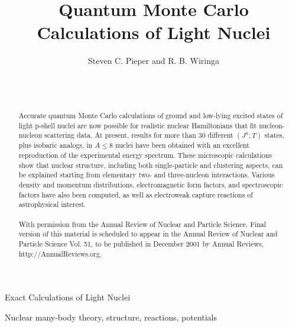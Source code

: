 
\renewcommand{\topfraction}{1.00}
\renewcommand{\bottomfraction}{1.00}
\renewcommand{\textfraction}{0.00}


\renewcommand{\baselinestretch}{1.0}
\renewcommand{\evensidemargin}{0pc}
\renewcommand{\oddsidemargin}{0pc}
\setlength{\textwidth}{5.42in}
\setlength{\textheight}{7.825in}




\def\ms{\hspace{1.5mm}}
\def\Athpi{A_{3\pi}^{\Delta R}}
\def\tvij{\tilde{v}_{ij}}
\def\tv{\tilde{v}}
\def\dvij{\delta v_{ij}}
\newcommand{\boldtau}{\mbox{\boldmath$\tau$}}
\newcommand{\boldsigma}{\mbox{\boldmath$\sigma$}}
\newcommand{\case}[2]{\textstyle{#1\over#2}}


\title{Quantum Monte Carlo Calculations of Light Nuclei}

{Exact Calculations of Light Nuclei}

\author{Steven C. Pieper and R. B. Wiringa
}

\begin{keywords}
Nuclear many-body theory, structure, reactions, potentials
\end{keywords}

\begin{abstract}
\date \\
\\

Accurate quantum Monte Carlo calculations of ground and low-lying excited
states of light p-shell nuclei are now possible for realistic nuclear
Hamiltonians that fit nucleon-nucleon scattering data.
At present, results for more than 30 different $(J^{\pi};T)$ states, plus
isobaric analogs, in $A \leq 8$ nuclei have been obtained with an 
excellent reproduction of the experimental energy spectrum.
These microscopic calculations show that nuclear structure, including
both single-particle and clustering aspects, can be explained starting 
from elementary two- and three-nucleon interactions.
Various density and momentum distributions, electromagnetic form factors,
and spectroscopic factors have also been computed, as well as
electroweak capture reactions of astrophysical interest.\\
\\

With permission from the Annual Review of Nuclear and Particle
Science. Final version of this material is scheduled to appear in the Annual
Review of Nuclear and Particle Science Vol. 51, to be published in December
2001 by Annual Reviews, http://AnnualReviews.org.


\end{abstract}

